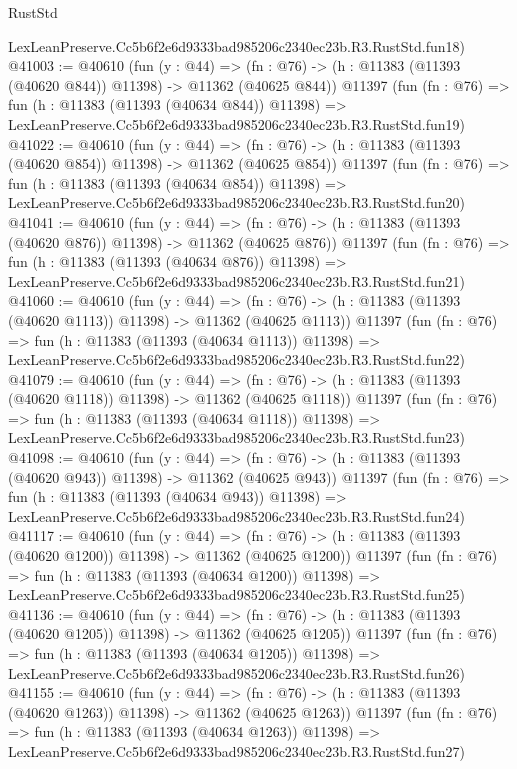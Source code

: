 \begin{lexlean}{RustStd}
\begin{coremodule}
    LexLeanPreserve.Cc5b6f2e6d9333bad985206c2340ec23b.R3.RustStd.fun18)
@41003 := @40610
    (fun (y : @44) =>
    (fn : @76) -> (h : @11383 (@11393 (@40620 @844)) @11398) -> @11362 (@40625 @844))
    @11397
    (fun (fn : @76) =>
    fun (h : @11383 (@11393 (@40634 @844)) @11398) =>
    LexLeanPreserve.Cc5b6f2e6d9333bad985206c2340ec23b.R3.RustStd.fun19)
@41022 := @40610
    (fun (y : @44) =>
    (fn : @76) -> (h : @11383 (@11393 (@40620 @854)) @11398) -> @11362 (@40625 @854))
    @11397
    (fun (fn : @76) =>
    fun (h : @11383 (@11393 (@40634 @854)) @11398) =>
    LexLeanPreserve.Cc5b6f2e6d9333bad985206c2340ec23b.R3.RustStd.fun20)
@41041 := @40610
    (fun (y : @44) =>
    (fn : @76) -> (h : @11383 (@11393 (@40620 @876)) @11398) -> @11362 (@40625 @876))
    @11397
    (fun (fn : @76) =>
    fun (h : @11383 (@11393 (@40634 @876)) @11398) =>
    LexLeanPreserve.Cc5b6f2e6d9333bad985206c2340ec23b.R3.RustStd.fun21)
@41060 := @40610
    (fun (y : @44) =>
    (fn : @76) -> (h : @11383 (@11393 (@40620 @1113)) @11398) -> @11362 (@40625 @1113))
    @11397
    (fun (fn : @76) =>
    fun (h : @11383 (@11393 (@40634 @1113)) @11398) =>
    LexLeanPreserve.Cc5b6f2e6d9333bad985206c2340ec23b.R3.RustStd.fun22)
@41079 := @40610
    (fun (y : @44) =>
    (fn : @76) -> (h : @11383 (@11393 (@40620 @1118)) @11398) -> @11362 (@40625 @1118))
    @11397
    (fun (fn : @76) =>
    fun (h : @11383 (@11393 (@40634 @1118)) @11398) =>
    LexLeanPreserve.Cc5b6f2e6d9333bad985206c2340ec23b.R3.RustStd.fun23)
@41098 := @40610
    (fun (y : @44) =>
    (fn : @76) -> (h : @11383 (@11393 (@40620 @943)) @11398) -> @11362 (@40625 @943))
    @11397
    (fun (fn : @76) =>
    fun (h : @11383 (@11393 (@40634 @943)) @11398) =>
    LexLeanPreserve.Cc5b6f2e6d9333bad985206c2340ec23b.R3.RustStd.fun24)
@41117 := @40610
    (fun (y : @44) =>
    (fn : @76) -> (h : @11383 (@11393 (@40620 @1200)) @11398) -> @11362 (@40625 @1200))
    @11397
    (fun (fn : @76) =>
    fun (h : @11383 (@11393 (@40634 @1200)) @11398) =>
    LexLeanPreserve.Cc5b6f2e6d9333bad985206c2340ec23b.R3.RustStd.fun25)
@41136 := @40610
    (fun (y : @44) =>
    (fn : @76) -> (h : @11383 (@11393 (@40620 @1205)) @11398) -> @11362 (@40625 @1205))
    @11397
    (fun (fn : @76) =>
    fun (h : @11383 (@11393 (@40634 @1205)) @11398) =>
    LexLeanPreserve.Cc5b6f2e6d9333bad985206c2340ec23b.R3.RustStd.fun26)
@41155 := @40610
    (fun (y : @44) =>
    (fn : @76) -> (h : @11383 (@11393 (@40620 @1263)) @11398) -> @11362 (@40625 @1263))
    @11397
    (fun (fn : @76) =>
    fun (h : @11383 (@11393 (@40634 @1263)) @11398) =>
    LexLeanPreserve.Cc5b6f2e6d9333bad985206c2340ec23b.R3.RustStd.fun27)

\end{coremodule}
\end{lexlean}
